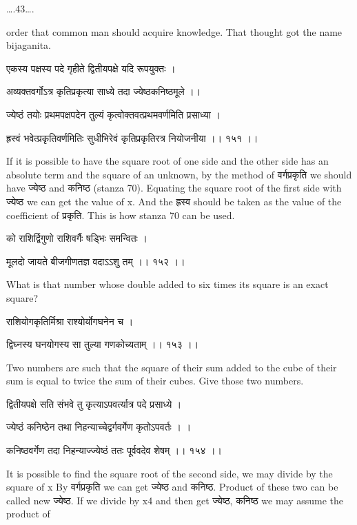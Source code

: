 \documentclass[]{article}
\date{}
\begin{document}
{\ldots{}.43\ldots{}.}

{order that common man should acquire knowledge. That thought got the
name bijaganita.}

{एकस्य पक्षस्य पदे गृहीते द्वितीयपक्षे यदि रूपयुक्तः । }

{अव्यक्तवर्गोऽत्र कृतिप्रकृत्या साध्ये तदा ज्येष्ठकनिष्ठमूले ।। }

{ज्येष्ठं तयोः प्रथमपक्षपदेन तुल्यं कृत्वोक्तवत्प्रथमवर्णमिति प्रसाध्या
। }

{ह्रस्वं भवेत्प्रकृतिवर्णमितिः सुधीभिरेवं कृतिप्रकृतिरत्र नियोजनीया ।।
१५१ ।।}

{If it is possible to have the square root of one side and the other
side has an absolute term and the square of an unknown, by the method of
वर्गप्रकृति we should have ज्येष्ठ and कनिष्ठ (stanza 70). Equating the
square root of the first side with ज्येष्ठ we can get the value of x.
And the ह्रस्व should be taken as the value of the coefficient of
प्रकृति. This is how stanza 70 can be used.}

{को राशिर्द्विगुणो राशिवर्गैः षड्भिः समन्वितः । }

{मूलदो जायते बीजगीणतज्ञ वदाऽऽशु तम् ।। १५२ ।। }

{What is that number whose double added to six times its square is an
exact square?}

{राशियोगकृतिर्मिश्रा राश्योर्योगघनेन च । }

{द्विघ्नस्य घनयोगस्य सा तुल्या गणकोच्यताम् ।। १५३ ।। }

{Two numbers are such that the square of their sum added to the cube of
their sum is equal to twice the sum of their cubes. Give those two
numbers.}

{द्वितीयपक्षे सति संभवे तु कृत्याऽपवर्त्यात्र पदे प्रसाध्ये । }

{ज्येष्ठं कनिष्ठेन तथा निहन्याच्चेद्वर्गवर्गेण कृतोऽपवर्तः । । }

{कनिष्ठवर्गेण तदा निहन्याज्ज्येष्ठं ततः पूर्ववदेव शेषम् ।। १५४ ।। }

{It is possible to find the square root of the second side, we may
divide by the square of x By वर्गप्रकृति we can get ज्येष्ठ and कनिष्ठ.
Product of these two can be called new ज्येष्ठ. If we divide by x}{4}{
and then get ज्येष्ठ, कनिष्ठ we may assume the product of\\
}
\end{document}

